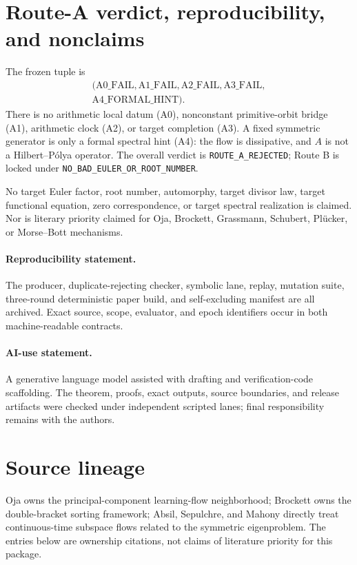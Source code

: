\documentclass[10pt]{article}
\begin{document}
\section{Route-A verdict, reproducibility, and nonclaims}
The frozen tuple is
\[
 \begin{gathered}
 (\mathrm{A0\_FAIL},\mathrm{A1\_FAIL},\mathrm{A2\_FAIL},
 \mathrm{A3\_FAIL},\\
 \mathrm{A4\_FORMAL\_HINT}).
 \end{gathered}
\]
There is no arithmetic local datum (A0), nonconstant primitive-orbit bridge
(A1), arithmetic clock (A2), or target completion (A3).  A fixed symmetric
generator is only a formal spectral hint (A4): the flow is dissipative, and
$A$ is not a Hilbert--P\'olya operator.  The overall verdict is
\texttt{ROUTE\_A\_REJECTED}; Route B is locked under
\texttt{NO\_BAD\_EULER\_OR\_ROOT\_NUMBER}.

No target Euler factor, root number, automorphy, target divisor law, target
functional equation, zero correspondence, or target spectral realization is
claimed.  Nor is literary priority claimed for Oja, Brockett, Grassmann,
Schubert, Pl\"ucker, or Morse--Bott mechanisms.

\paragraph{Reproducibility statement.}
The producer, duplicate-rejecting checker, symbolic lane, replay, mutation
suite, three-round deterministic paper build, and self-excluding manifest are
all archived.  Exact source, scope, evaluator, and epoch identifiers occur in
both machine-readable contracts.

\paragraph{AI-use statement.}
A generative language model assisted with drafting and verification-code
scaffolding.  The theorem, proofs, exact outputs, source boundaries, and
release artifacts were checked under independent scripted lanes; final
responsibility remains with the authors.
\fi

\section*{Source lineage}
Oja owns the principal-component learning-flow neighborhood; Brockett owns the
double-bracket sorting framework; Absil, Sepulchre, and Mahony directly treat
continuous-time subspace flows related to the symmetric eigenproblem.  The
entries below are ownership citations, not claims of literature priority for
this package.
\end{document}
